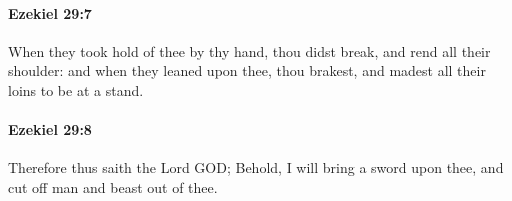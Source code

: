 		\paragraph{Ezekiel 29:7} %
			\label{EZEKIEL-29-7}

			When they took hold of thee by thy hand, thou didst break, and rend all their shoulder: and when they leaned upon thee, thou brakest, and madest all their loins to be at a stand.


		\paragraph{Ezekiel 29:8} %
			\label{EZEKIEL-29-8}

			Therefore thus saith the Lord GOD; Behold, I will bring a sword upon thee, and cut off man and beast out of thee.


